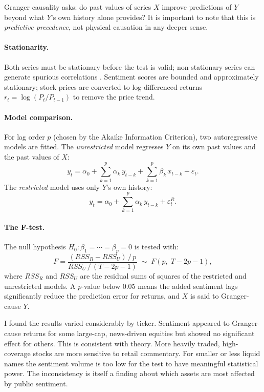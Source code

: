 Granger causality \citep{granger1969} asks: do past values of series $X$ improve
predictions of $Y$ beyond what $Y$'s own history alone provides?
It is important to note that this is \emph{predictive precedence}, not physical causation
in any deeper sense.

\paragraph{Stationarity.}
Both series must be stationary before the test is valid; non-stationary series can
generate spurious correlations \citep{engle1987cointegration}.
Sentiment scores are bounded and approximately stationary; stock prices are converted to
log-differenced returns $r_t = \log(P_t / P_{t-1})$ to remove the price trend.

\paragraph{Model comparison.}
For lag order $p$ (chosen by the Akaike Information Criterion), two autoregressive
models are fitted.
The \emph{unrestricted} model regresses $Y$ on its own past values and the past values
of $X$:
\begin{equation}
  y_t
  = \alpha_0
    + \sum_{k=1}^{p} \alpha_k\, y_{t-k}
    + \sum_{k=1}^{p} \beta_k\, x_{t-k}
    + \varepsilon_t.
  \label{eq:var_unrest}
\end{equation}
The \emph{restricted} model uses only $Y$'s own history:
\begin{equation}
  y_t
  = \alpha_0
    + \sum_{k=1}^{p} \alpha_k\, y_{t-k}
    + \varepsilon_t^R.
  \label{eq:var_rest}
\end{equation}

\paragraph{The F-test.}
The null hypothesis $H_0\colon \beta_1 = \cdots = \beta_p = 0$ is tested with:
\begin{equation}
  F = \frac{(RSS_R - RSS_U)\,/\,p}{RSS_U\,/\,(T - 2p - 1)}
  \;\sim\; F\!\left(p,\;T - 2p - 1\right),
  \label{eq:granger_f}
\end{equation}
where $RSS_R$ and $RSS_U$ are the residual sums of squares of the restricted and
unrestricted models.
A $p$-value below 0.05 means the added sentiment lags significantly reduce the
prediction error for returns, and $X$ is said to Granger-cause $Y$.

I found the results varied considerably by ticker.
Sentiment appeared to Granger-cause returns for some large-cap, news-driven equities
but showed no significant effect for others.
This is consistent with theory. More heavily traded, high-coverage stocks are more
sensitive to retail commentary. For smaller or less liquid names the sentiment volume
is too low for the test to have meaningful statistical power.
The inconsistency is itself a finding about which assets are most affected by public
sentiment.

